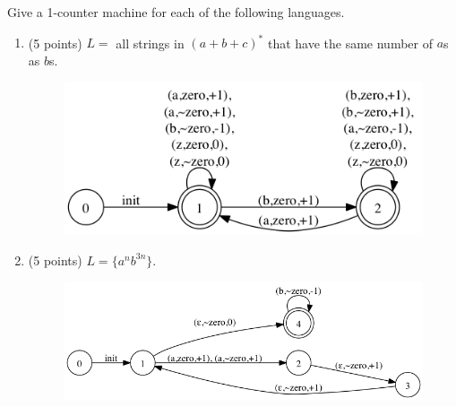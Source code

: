 \documentclass[paper=a4, fontsize=11pt]{scrartcl} %
\begin{document}
\maketitle %

\section{}

\begin{fancyquotes}
  Give a 1-counter machine for each of the following languages.
\end{fancyquotes}

\begin{enumerate}
\item
  \begin{fancyquotes}
    (5 points) $L=$ all strings in ${(a+b+c)}^{*}$ that have the same
    number of $a$s as $b$s.
  \end{fancyquotes}

  \begin{figure}[hp]
    \centering
    \includegraphics[width=.5\textwidth]{8-1.gv.png}
  \end{figure}

\item
  \begin{fancyquotes}
    (5 points) $L = \{a^{n}b^{3n}\}$.
  \end{fancyquotes}

  \begin{figure}[hp]
    \centering
    \includegraphics[width=.7\textwidth]{8-1.gv.2.png}
  \end{figure}

\end{enumerate}
\end{document}
